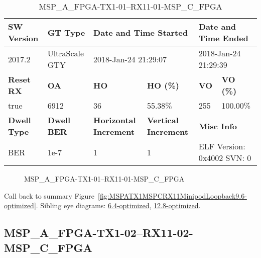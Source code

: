 \begin{table}[h]
\centering
\caption{MSP\_A\_FPGA-TX1-01--RX11-01-MSP\_C\_FPGA}
\label{tab:MSPAFPGATX101RX1101MSPCFPGA9.6-optimized}
\begin{tabular}{@{}|l|l|l|l|l|l|@{}}
\toprule
\textbf{SW Version}                & \textbf{GT Type}   & \multicolumn{2}{l|}{\textbf{Date and Time Started}}            & \multicolumn{2}{l|}{\textbf{Date and Time Ended}}        \\ \midrule
2017.2                       & UltraScale GTY          & \multicolumn{2}{l|}{2018-Jan-24 21:29:07}                   & \multicolumn{2}{l|}{2018-Jan-24 21:29:39}               \\ \midrule
\textbf{Reset RX}                  & \textbf{OA} & \textbf{HO}   & \textbf{HO (\%)} & \textbf{VO} & \textbf{VO (\%)} \\ \midrule
true & 6912        & 36          & 55.38\%        & 255        & 100.00\%       \\ \midrule
\textbf{Dwell Type}                & \textbf{Dwell BER} & \textbf{Horizontal Increment} & \textbf{Vertical Increment}    & \multicolumn{2}{l|}{\textbf{Misc Info}}                  \\ \midrule
BER                            & 1e-7        & 1        & 1           & \multicolumn{2}{l|}{ELF Version: 0x4002 SVN: 0}                         \\ \bottomrule
\end{tabular}
\end{table}

\begin{figure}[h]
\caption{MSP\_A\_FPGA-TX1-01--RX11-01-MSP\_C\_FPGA} \label{fig:MSPAFPGATX101RX1101MSPCFPGA9.6-optimized}
\end{figure}

Call back to summary Figure~\ref{fig:MSPATX1MSPCRX11MinipodLoopback9.6-optimized}.
Sibling eye diagrams: \hyperref[sec:MSPAFPGATX101RX1101MSPCFPGA6.4-optimized]{6.4-optimized}, \hyperref[sec:MSPAFPGATX101RX1101MSPCFPGA12.8-optimized]{12.8-optimized}.

\clearpage
\newpage


\subsection{MSP\_A\_FPGA-TX1-02--RX11-02-MSP\_C\_FPGA}\label{sec:MSPAFPGATX102RX1102MSPCFPGA9.6-optimized}

